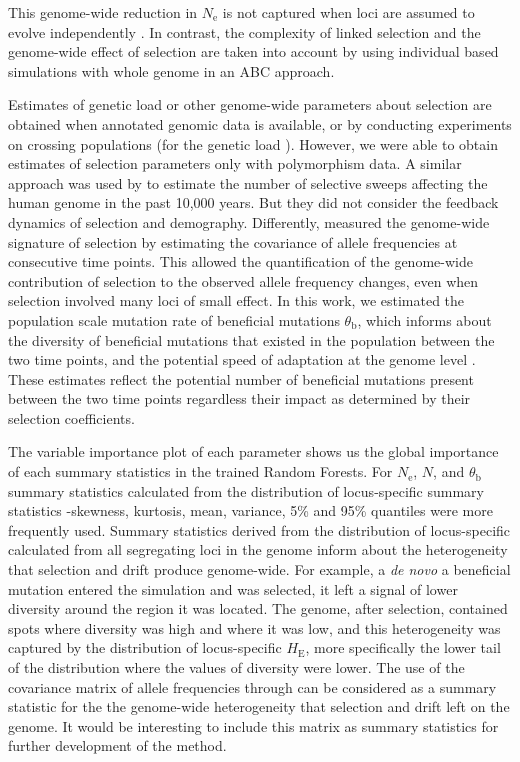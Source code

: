 \documentclass[a4paper, 12pt]{article}
\begin{document}
This genome-wide reduction in $N_{\mathrm{e}}$ is not captured when loci are assumed to evolve independently \citep[as in][for example]{Sheehan:2016caa}. In contrast, the complexity of linked selection and the genome-wide effect of selection are taken into account by using individual based simulations with whole genome in an ABC approach. 

Estimates of genetic load or other genome-wide parameters about selection are obtained when annotated genomic data is available, \citep{Henn:2015ce} or by conducting experiments on crossing populations (for the genetic load \citet{Plough:2016gw}). However, we were able to obtain estimates of selection parameters only with polymorphism data. A similar approach was used by \citet{Laval:2019jo} to estimate the number of selective sweeps affecting the human genome in the past 10,000 years. But they did not consider the feedback dynamics of selection and demography. Differently, \citet{Buffalo:2020hq} measured the genome-wide signature of selection by estimating the covariance of allele frequencies at consecutive time points. This allowed the quantification of the genome-wide contribution of selection to the observed allele frequency changes, even when selection involved many loci of small effect. In this work, we estimated the population scale mutation rate of beneficial mutations $\theta_{\mathrm{b}}$, which informs about the diversity of beneficial mutations that existed in the population between the two time points, and the potential speed of adaptation at the genome level \citep{Hermisson:2017hw}. These estimates reflect the potential number of beneficial mutations present between the two time points regardless their impact as determined by their selection coefficients.

The variable importance plot of each parameter shows us the global importance of each summary statistics in the trained Random Forests. For $N_{\mathrm{e}}$, $N$, and $\theta_{\mathrm{b}}$ summary statistics calculated from the distribution of locus-specific summary statistics -skewness, kurtosis, mean, variance, 5\% and 95\% quantiles were more frequently used. Summary statistics derived from the distribution of locus-specific calculated from all segregating loci in the genome inform about the heterogeneity that selection and drift produce genome-wide. For example, a \textit{de novo} a beneficial mutation entered the simulation and was selected, it left a signal of lower diversity around the region it was located. The genome, after selection, contained spots where diversity was high and where it was low, and this heterogeneity was captured by the distribution of locus-specific $H_{\mathrm{E}}$, more specifically the lower tail of the distribution where the values of diversity were lower. The use of the covariance matrix of allele frequencies through \citet{Buffalo:2020hq} can be considered as a summary statistic for the the genome-wide heterogeneity that selection and drift left on the genome. It would be interesting to include this matrix as summary statistics for further development of the method.
\end{document}
